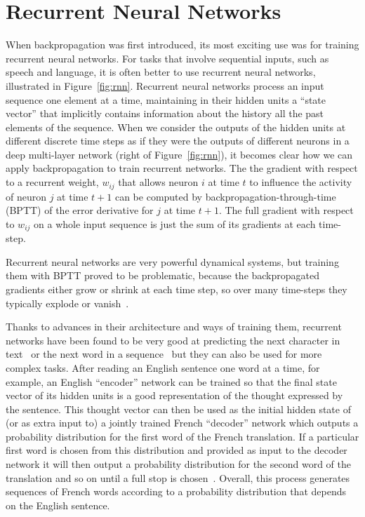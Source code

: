 \documentclass[10pts]{article}
\begin{document}

\section{Recurrent Neural Networks}
\label{sec:rnn}

When backpropagation was first introduced, its most exciting use was
for training recurrent neural networks. 
For tasks that involve sequential inputs, such as speech and language,
it is often better to use recurrent neural networks, illustrated in
Figure~\ref{fig:rnn}.  Recurrent neural networks process an input
sequence one element at a time, maintaining in their hidden units a
``state vector'' that implicitly contains information about the
history all the past elements of the sequence.  
When we consider the outputs of
the hidden units at different discrete time steps as if they were the
outputs of different neurons in a deep multi-layer network (right of
Figure~\ref{fig:rnn}), it becomes
clear how we can apply backpropagation to train recurrent
networks. The the gradient with respect to a recurrent weight,
$w_{ij}$ that allows neuron $i$ at time $t$ to influence the activity
of neuron $j$ at time $t+1$ can be computed by
backpropagation-through-time (BPTT) of the error derivative for $j$ at
time $t+1$. The full gradient with respect to $w_{ij}$ on a whole
input sequence is just the sum of its gradients at each time-step.

Recurrent neural networks are very powerful dynamical systems, but
training them with BPTT proved to be problematic, because the
backpropagated gradients either grow or shrink at each time step, so
over many time-steps they typically explode or
vanish~\citep{Hochreiter91-small,Bengio-et-al-TNN1994}.

Thanks to advances in their architecture and ways of training them, recurrent networks 
have been found to be very good at predicting the next character in
text~\citep{Sutskever-et-al-ICML2011} or the next word in a
sequence~\citep{Mikolov-et-al-NIPS2013} but they can also be used for
more complex tasks.  After reading an English sentence one word at a
time, for example, an English ``encoder'' network can be trained so
that the final state vector of its hidden units is a good
representation of the thought expressed by the sentence.  This thought
vector can then be used as the initial hidden state of (or as extra
input to) a jointly trained French ``decoder'' network which outputs a
probability distribution for the first word of the French
translation. If a particular first word is chosen from this
distribution and provided as input to the decoder network it will then
output a probability distribution for the second word of the
translation and so on until a full stop is
chosen~\citep{Bahdanau-et-al-arxiv2014,Sutskever-et-al-NIPS2014}.
Overall, this process generates sequences of French words according to
a probability distribution that depends on the English sentence.
\end{document}
